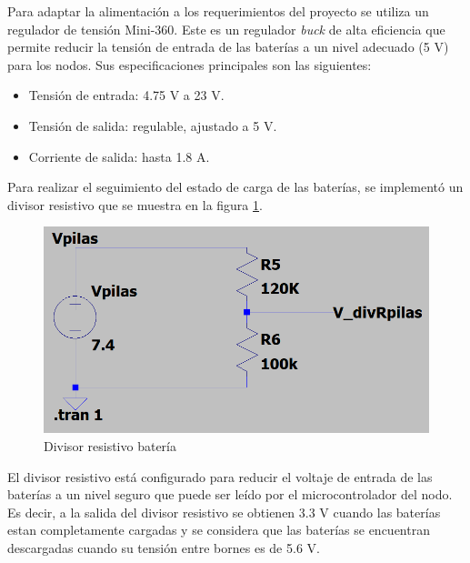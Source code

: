 Para adaptar la alimentación a los requerimientos del proyecto se utiliza un regulador de tensión Mini-360. Este es un regulador \textit{buck} de alta eficiencia que permite reducir la tensión de entrada de las baterías a un nivel adecuado (5 V) para los nodos. Sus especificaciones principales son las siguientes:

\begin{itemize}
    \item Tensión de entrada: 4.75 V a 23 V.
    \item Tensión de salida: regulable, ajustado a 5 V.
    \item Corriente de salida: hasta 1.8 A.
\end{itemize}

Para realizar el seguimiento del estado de carga de las baterías, se implementó un divisor resistivo que se muestra en la figura \ref{fig:DivresistivoBat}.

\begin{figure}[H]
	\centering
	\includegraphics[scale=0.6]{./Figures/Hardware/Alimentacion/divisor_pilas.png}
	\caption{Divisor resistivo batería}
	\label{fig:DivresistivoBat}
\end{figure}

El divisor resistivo está configurado para reducir el voltaje de entrada de las baterías a un nivel seguro que puede ser leído por el microcontrolador del nodo. 
Es decir, a la salida del divisor resistivo se obtienen 3.3 V cuando las baterías estan completamente cargadas y se considera que las baterías se encuentran descargadas cuando su tensión entre bornes es de 5.6 V.


